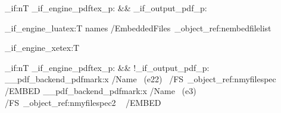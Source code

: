 \documentclass{article}
\begin{document}
\bool_if:nT {\sys_if_engine_pdftex_p: && \sys_if_output_pdf_p:}
 {
 }

\sys_if_engine_luatex:T
 {
   \pdfextension names {/EmbeddedFiles~\pdf_object_ref:n{embedfilelist} }
 }

\sys_if_engine_xetex:T
 {
 }

\bool_if:nT {\sys_if_engine_pdftex_p: && !\sys_if_output_pdf_p:}
 {
   \__pdf_backend_pdfmark:x
     {
       /Name~ (e22)~
       /FS~\pdf_object_ref:n{myfilespec}
       ~ /EMBED
   }
   \__pdf_backend_pdfmark:x
     {
       /Name~ (e3)~
       /FS~\pdf_object_ref:n{myfilespec2}
       ~ /EMBED
   }
  }



\ExplSyntaxOff
\end{document}
